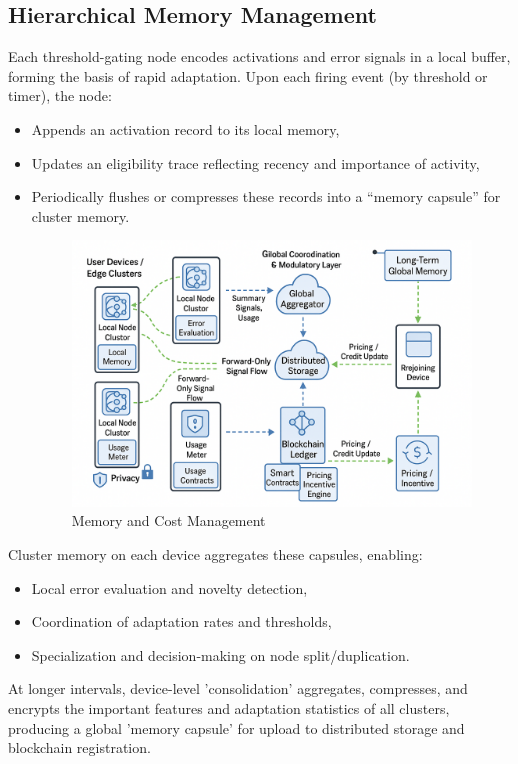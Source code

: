 \documentclass[11pt]{article}
\begin{document}
\subsection{Hierarchical Memory Management}
Each threshold-gating node encodes activations and error signals in a local buffer, forming the basis of rapid adaptation. Upon each firing event (by threshold or timer), the node:
\begin{itemize}
    \item Appends an activation record to its local memory,
    \item Updates an eligibility trace reflecting recency and importance of activity,
    \item Periodically flushes or compresses these records into a “memory capsule” for cluster memory.
    \begin{figure}
        \centering
        \includegraphics[width=0.6\linewidth]{architecture_diagrams/37f16f0b-ac7a-44b5-8a94-e48c92587896.png}
        \caption{Memory and Cost Management}
        \label{fig:memory-and-cost-management}
    \end{figure}
\end{itemize}
Cluster memory on each device aggregates these capsules, enabling:
\begin{itemize}
    \item Local error evaluation and novelty detection,
    \item Coordination of adaptation rates and thresholds,
    \item Specialization and decision-making on node split/duplication.
\end{itemize}
At longer intervals, device-level 'consolidation' aggregates, compresses, and encrypts the important features and adaptation statistics of all clusters, producing a global 'memory capsule' for upload to distributed storage and blockchain registration.
\end{document}
